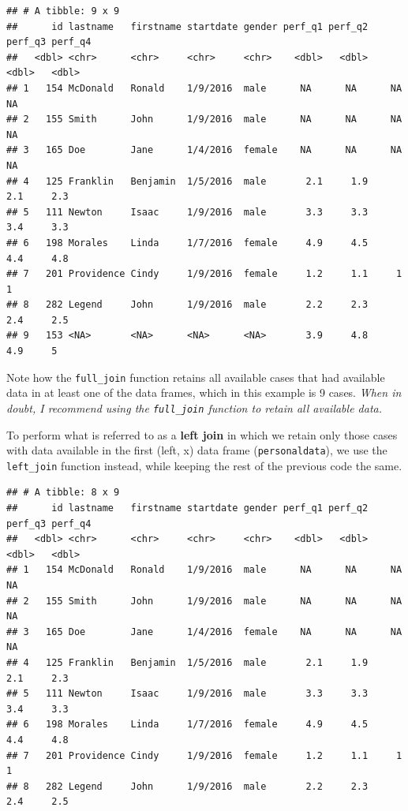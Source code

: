 \documentclass[]{book}
\newenvironment{Shaded}{\begin{snugshade}}{\end{snugshade}}
\newcommand{\KeywordTok}[1]{\textcolor[rgb]{0.13,0.29,0.53}{\textbf{#1}}}
\newcommand{\DataTypeTok}[1]{\textcolor[rgb]{0.13,0.29,0.53}{#1}}
\newcommand{\StringTok}[1]{\textcolor[rgb]{0.31,0.60,0.02}{#1}}
\newcommand{\CommentTok}[1]{\textcolor[rgb]{0.56,0.35,0.01}{\textit{#1}}}
\newcommand{\OperatorTok}[1]{\textcolor[rgb]{0.81,0.36,0.00}{\textbf{#1}}}
\newcommand{\NormalTok}[1]{#1}
\begin{document}
\begin{verbatim}
## # A tibble: 9 x 9
##      id lastname   firstname startdate gender perf_q1 perf_q2 perf_q3 perf_q4
##   <dbl> <chr>      <chr>     <chr>     <chr>    <dbl>   <dbl>   <dbl>   <dbl>
## 1   154 McDonald   Ronald    1/9/2016  male      NA      NA      NA      NA  
## 2   155 Smith      John      1/9/2016  male      NA      NA      NA      NA  
## 3   165 Doe        Jane      1/4/2016  female    NA      NA      NA      NA  
## 4   125 Franklin   Benjamin  1/5/2016  male       2.1     1.9     2.1     2.3
## 5   111 Newton     Isaac     1/9/2016  male       3.3     3.3     3.4     3.3
## 6   198 Morales    Linda     1/7/2016  female     4.9     4.5     4.4     4.8
## 7   201 Providence Cindy     1/9/2016  female     1.2     1.1     1       1  
## 8   282 Legend     John      1/9/2016  male       2.2     2.3     2.4     2.5
## 9   153 <NA>       <NA>      <NA>      <NA>       3.9     4.8     4.9     5
\end{verbatim}

Note how the \texttt{full\_join} function retains all available cases
that had available data in at least one of the data frames, which in
this example is 9 cases. \emph{When in doubt, I recommend using the
\texttt{full\_join} function to retain all available data.}

To perform what is referred to as a \textbf{left join} in which we
retain only those cases with data available in the first (left, x) data
frame (\texttt{personaldata}), we use the \texttt{left\_join} function
instead, while keeping the rest of the previous code the same.

\begin{Shaded}
\end{Shaded}

\begin{verbatim}
## # A tibble: 8 x 9
##      id lastname   firstname startdate gender perf_q1 perf_q2 perf_q3 perf_q4
##   <dbl> <chr>      <chr>     <chr>     <chr>    <dbl>   <dbl>   <dbl>   <dbl>
## 1   154 McDonald   Ronald    1/9/2016  male      NA      NA      NA      NA  
## 2   155 Smith      John      1/9/2016  male      NA      NA      NA      NA  
## 3   165 Doe        Jane      1/4/2016  female    NA      NA      NA      NA  
## 4   125 Franklin   Benjamin  1/5/2016  male       2.1     1.9     2.1     2.3
## 5   111 Newton     Isaac     1/9/2016  male       3.3     3.3     3.4     3.3
## 6   198 Morales    Linda     1/7/2016  female     4.9     4.5     4.4     4.8
## 7   201 Providence Cindy     1/9/2016  female     1.2     1.1     1       1  
## 8   282 Legend     John      1/9/2016  male       2.2     2.3     2.4     2.5
\end{verbatim}
\end{document}
